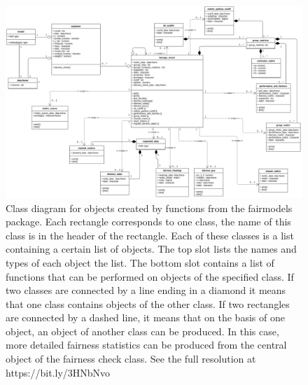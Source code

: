 \begin{Schunk}
\begin{figure}

{\centering \includegraphics[width=1\linewidth]{class_diagram} 

}

\caption[Class diagram for objects created by functions from the fairmodels package]{Class diagram for objects created by functions from the fairmodels package. Each rectangle corresponds to one class, the name of this class is in the header of the rectangle. Each of these classes is a list containing a certain list of objects. The top slot lists the names and types of each object the list. The bottom slot contains a list of functions that can be performed on objects of the specified class. If two classes are connected by a line ending in a diamond it means that one class contains objects of the other class. If two rectangles are connected by a dashed line, it means that on the basis of one object, an object of another class can be produced. In this case, more detailed fairness statistics can be produced from the central object of the fairness check class. See the full resolution at https://bit.ly/3HNbNvo}\label{fig:classdiagram}
\end{figure}
\end{Schunk}

